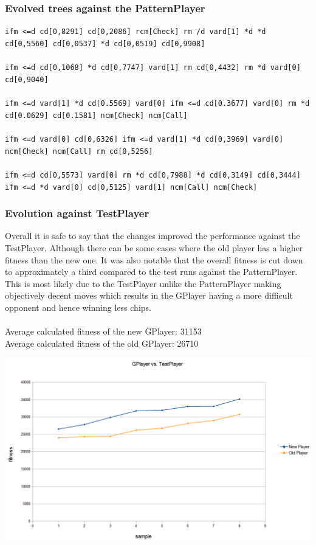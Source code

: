 \documentclass[12pt,fleqn,a4paper]{article}
\begin{document}
\subsubsection{Evolved trees against the PatternPlayer}
\texttt{ifm <=d cd[0,8291] cd[0,2086] rcm[Check] rm /d vard[1] *d *d cd[0,5560] cd[0,0537] *d cd[0,0519] cd[0,9908]} \\ \\
\texttt{ifm <=d cd[0,1068] *d cd[0,7747] vard[1] rm cd[0,4432] rm *d vard[0] cd[0,9040]}\\ \\
\texttt{ifm <=d vard[1] *d cd[0.5569] vard[0] ifm <=d cd[0.3677] vard[0] rm *d cd[0.0629] cd[0.1581] ncm[Check] ncm[Call]}\\ \\
\texttt{ifm <=d vard[0] cd[0,6326] ifm <=d vard[1] *d cd[0,3969] vard[0] ncm[Check] ncm[Call] rm cd[0,5256]}\\ \\
\texttt{ifm <=d cd[0,5573] vard[0] rm *d cd[0,7988] *d cd[0,3149] cd[0,3444] ifm <=d *d vard[0] cd[0,5125] vard[1] ncm[Call] ncm[Check]}

\subsubsection{Evolution against TestPlayer}
Overall it is safe to say that the changes improved the performance against the TestPlayer. Although there can be some cases where the old player has a higher fitness than the new one. It was also notable that the overall fitness is cut down to approximately a third compared to the test runs against the PatternPlayer. This is most likely due to the TestPlayer unlike the PatternPlayer making objectively decent moves which results in the GPlayer having a more difficult opponent and hence winning less chips.\\
\\
Average calculated fitness of the new GPlayer: 31153\\
Average calculated fitness of the old GPlayer: 26710

\begin{center}
	\includegraphics[width=.9\textwidth]{gp_vs_tp_1.png}
\end{center}
\end{document}
